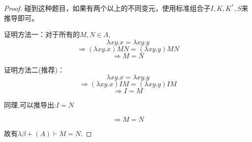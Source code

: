 
\begin{proof}碰到这种题目，如果有两个以上的不同变元，使用标准组合子$I, K, K^*, S$来推导即可。

证明方法一：对于所有的$M,N\in\Lambda$,
$$ \lambda xy.x=\lambda xy.y $$
$$ \Rightarrow (\lambda xy.x)MN=(\lambda xy.y)MN $$
$$ \Rightarrow M=N $$

证明方法二(推荐)：
$$ \lambda xy.x=\lambda xy.y $$
$$ \Rightarrow (\lambda xy.x)IM=(\lambda xy.y)IM $$
$$ \Rightarrow I=M $$

同理,可以推导出:\qquad \qquad \qquad \qquad \quad $ I=N $

$$ \Rightarrow M=N $$

故有$\lambda\beta+(A)\vdash M=N$.

\end{proof}